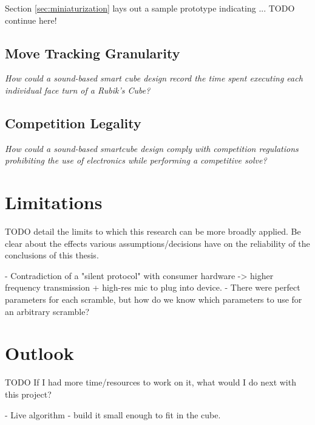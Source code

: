 Section \ref{sec:miniaturization} lays out a sample prototype indicating ... TODO continue here!

\subsection{Move Tracking Granularity}
\label{subsec:answer-granularity}

\emph{How could a sound-based smart cube design record the time spent
executing each individual face turn of a Rubik's Cube?}

\subsection{Competition Legality}
\label{subsec:answer-competition-legality}

\emph{How could a sound-based smartcube design comply with competition
regulations prohibiting the use of electronics while performing a
competitive solve?}


\section{Limitations}

TODO detail the limits to which this research can be more broadly
applied. Be clear about the effects various assumptions/decisions have
on the reliability of the conclusions of this thesis.

- Contradiction of a "silent protocol" with consumer hardware -> higher frequency transmission + high-res mic to plug into device.
- There were perfect parameters for each scramble, but how do we know which parameters to use for an arbitrary scramble?


\section{Outlook}

TODO If I had more time/resources to work on it, what would I do next
with this project?

- Live algorithm
- build it small enough to fit in the cube.